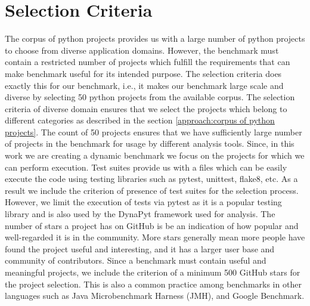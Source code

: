 \section{Selection Criteria}
\label{approach:selection criteria}
The corpus of python projects provides us with a large number of python projects to choose from diverse application domains. However, the benchmark must contain a restricted number of projects which fulfill the requirements that can make benchmark useful for its intended purpose. The selection criteria does exactly this for our benchmark, i.e., it makes our benchmark large scale and diverse by selecting 50 python projects from the available corpus. The selection criteria of diverse domain ensures that we select the projects which belong to different categories as described in the section \ref{approach:corpus of python projects}. The count of 50 projects ensures that we have sufficiently large number of projects in the benchmark for usage by different analysis tools. Since, in this work we are creating a dynamic benchmark we focus on the projects for which we can perform execution. Test suites provide us with a files which can be easily execute the code using testing libraries such as pytest, unittest, flake8, etc. As a result we include the criterion of presence of test suites for the selection process. However, we limit the execution of tests via pytest as it is a popular testing library and is also used by the DynaPyt framework used for analysis. The number of stars a project has on GitHub is be an indication of how popular and well-regarded it is in the community. More stars generally mean more people have found the project useful and interesting, and it has a larger user base and community of contributors. Since a benchmark must contain useful and meaningful projects, we include the criterion of a minimum 500 GitHub stars for the project selection. This is also a common practice among benchmarks in other languages such as Java Microbenchmark Harness (JMH), and Google Benchmark. 


